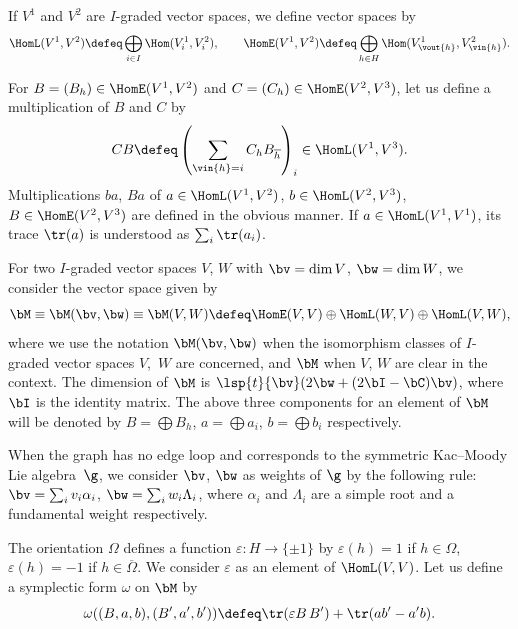 If $V^1$ and $V^2$ are $I$-graded vector spaces, we def\/ine vector spaces by
\begin{gather*}
  \HomL(V^1, V^2) \defeq
  \bigoplus_{i\in I} \Hom(V^1_i, V^2_i), \qquad
  \HomE(V^1, V^2) \defeq
  \bigoplus_{h\in H} \Hom(V^1_{\vout{h}}, V^2_{\vin{h}})
  .
\end{gather*}


For $B = (B_h) \in \HomE(V^1, V^2)$ and
$C = (C_h) \in \HomE(V^2, V^3)$, let us def\/ine a multiplication of $B$
and $C$ by
\[
  CB \defeq \left(\sum_{\vin{h} = i} C_h B_{\overline h}\right)_i \in
  \HomL(V^1, V^3).
\]
Multiplications $ba$, $Ba$ of $a\in \HomL(V^1,V^2)$, $b\in\HomL(V^2,
V^3)$, $B\in \HomE(V^2, V^3)$ are def\/ined in the obvious manner. If
$a\in\HomL(V^1, V^1)$, its trace $\tr(a)$ is understood as $\sum_i
\tr(a_i)$.

For two $I$-graded vector spaces $V$, $W$ with $\bv = \dim V$, $\bw =
\dim W$, we consider the vector space given by
\begin{equation*}\label{def:bM}
  \bM \equiv \bM(\bv,\bw) \equiv \bM(V, W) \defeq
  \HomE(V,V)\oplus \HomL(W,V)\oplus \HomL(V,W),
\end{equation*}
where we use the notation $\bM(\bv,\bw)$ when the isomorphism classes
of $I$-graded vector spaces $V$,~$W$ are concerned, and $\bM$ when
$V$, $W$ are clear in the context.
%
The dimension of $\bM$ is $\lsp{t}{\bv}(2\bw + (2\bI - \bC)\bv)$,
where $\bI$ is the identity matrix.
The above three components for an element of $\bM$ will be denoted by
$B = \bigoplus B_h $, $a = \bigoplus a_i$, $b = \bigoplus b_i$
respectively.

When the graph has no edge loop and corresponds to the symmetric
Kac--Moody Lie algeb\-ra~$\g$, we consider $\bv$, $\bw$ as weights of
$\g$ by the following rule: $\bv = \sum_i v_i \alpha_i$, $\bw = \sum_i
w_i\Lambda_i$, where $\alpha_i$ and $\Lambda_i$ are a simple root and
a fundamental weight respectively.

The orientation $\Omega$ def\/ines a function $\varepsilon\colon H \to
\{ \pm 1\}$ by $\varepsilon(h) = 1$ if $h\in\Omega$, $\varepsilon(h)=
-1$ if $h\in\overline\Omega$. We consider $\varepsilon$ as an element
of $\HomL(V, V)$.
%
Let us def\/ine a symplectic form $\omega$ on $\bM$ by
\begin{equation*}
        \omega((B, a, b), (B', a', b'))
        \defeq \tr(\varepsilon B\, B') + \tr(a b' - a' b).
\label{def:symplectic}\end{equation*}

